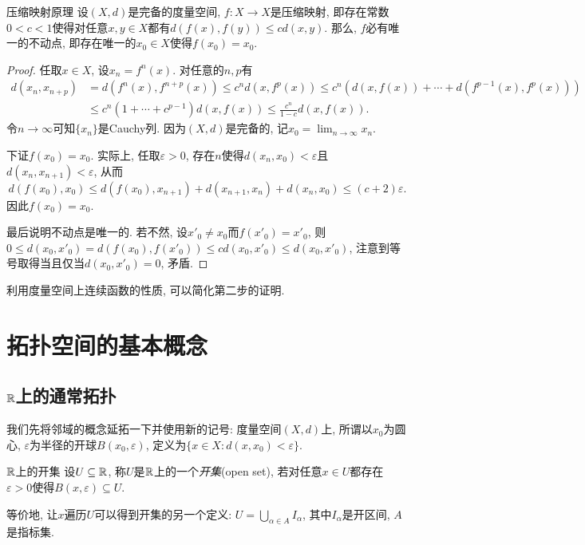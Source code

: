 \begin{theorem}{压缩映射原理}
	设$(X,d)$是完备的度量空间, $f:X \to X$是压缩映射, 即存在常数$0 < c < 1$使得对任意$x,y \in X$都有$d(f(x),f(y)) \leq cd(x,y)$. 那么, $f$必有唯一的不动点, 即存在唯一的$x_0 \in X$使得$f(x_0)=x_0$. 
\end{theorem}
\begin{proof}
	任取$x \in X$, 设$x_n=f^n(x)$. 对任意的$n,p$有
	\begin{align*}
		d(x_n,x_{n+p}) &= d(f^n(x),f^{n+p}(x)) \leq c^nd(x,f^p(x)) \leq c^n( d(x,f(x))+\cdots + d(f^{p-1}(x),f^p(x)) ) \\
		&\leq c^n(1+\cdots + c^{p-1}) d(x,f(x)) \leq \frac{c^n}{1-c} d(x,f(x)). 
	\end{align*}
	令$n\to \infty$可知$\{ x_n \}$是Cauchy列. 因为$(X,d)$是完备的, 记$x_0 = \lim_{n\to \infty} x_n$. 
	
	下证$f(x_0)=x_0$. 实际上, 任取$\varepsilon >0$, 存在$n$使得$d(x_n,x_0)<\varepsilon$且$d(x_n,x_{n+1})<\varepsilon$, 从而$$d(f(x_0),x_0) \leq d(f(x_0),x_{n+1}) + d(x_{n+1},x_n) + d(x_n,x_0) \leq (c+2)\varepsilon .$$
	因此$f(x_0)=x_0$. 
	
	最后说明不动点是唯一的. 若不然, 设$x'_0 \neq x_0$而$f(x'_0)=x'_0$, 则$0 \leq d(x_0,x'_0) = d(f(x_0),f(x'_0)) \leq cd(x_0,x'_0) \leq d(x_0,x'_0)$, 注意到等号取得当且仅当$d(x_0,x'_0)=0$, 矛盾. 
\end{proof}
\begin{remark}
	利用度量空间上连续函数的性质, 可以简化第二步的证明. 
\end{remark}




\newpage
\section{拓扑空间的基本概念}

\subsection{$\mathbb{R}$上的通常拓扑}

我们先将邻域的概念延拓一下并使用新的记号: 度量空间$(X,d)$上, 所谓以$x_0$为圆心, $\varepsilon$为半径的开球$B(x_0,\varepsilon)$, 定义为$\{ x \in X:d(x,x_0)<\varepsilon \}$. 

\begin{definition}{$\mathbb{R}$上的开集}
	设$U \subseteq \mathbb{R}$, 称$U$是$\mathbb{R}$上的一个\textit{开集}(open set), 若对任意$x \in U$都存在$\varepsilon >0$使得$B(x,\varepsilon) \subseteq U$. 
\end{definition}
\begin{remark}
	等价地, 让$x$遍历$U$可以得到开集的另一个定义: $U=\bigcup_{\alpha \in A} I_{\alpha}$, 其中$I_{\alpha}$是开区间, $A$是指标集. 
\end{remark}

